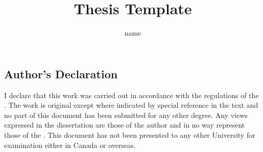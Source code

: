 \documentclass[12pt,twoside]{report}
\author{name}
\title{Thesis Template}
\begin{document}
\begin{preliminary}
\maketitle


\begin{abstract}
\blindtext
\end{abstract}


\chapter*{Author's Declaration}
\begin{center}
\begin{minipage}{4in}
\parindent=0pt I declare that this work
was carried out in accordance with the regulations of
the {\@university}. The
work is original except where indicated by special reference
in the text and no part of this document has been
submitted for any other degree.  Any views expressed in
the dissertation are those of the author and in no way
represent those of the {\@university}.  This document has not been presented to
any other University for examination either in Canada
or overseas.


\end{minipage}
\end{center}
\end{preliminary}
\end{document}

